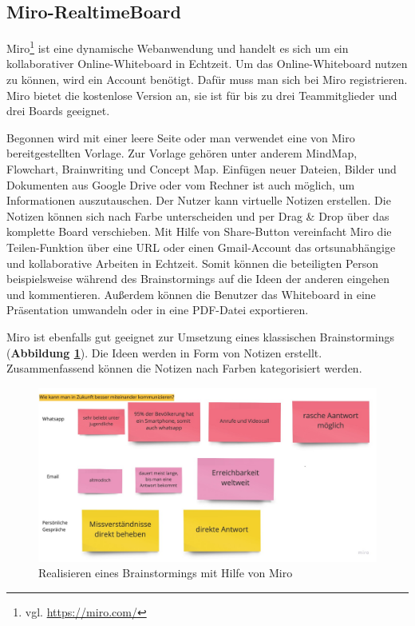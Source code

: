 \subsection{Miro-RealtimeBoard}
\label{sec:miro-realtimeBoard}
Miro\footnote{vgl. \url{https://miro.com/}} ist eine dynamische Webanwendung und handelt es sich um ein kollaborativer Online-Whiteboard in Echtzeit. Um das Online-Whiteboard nutzen zu können, wird ein Account benötigt. Dafür muss man sich bei Miro registrieren. Miro bietet die kostenlose Version an, sie ist für bis zu drei Teammitglieder und drei Boards geeignet.\bigskip

Begonnen wird mit einer leere Seite oder man verwendet eine von Miro bereitgestellten Vorlage. Zur Vorlage gehören unter anderem MindMap, Flowchart, Brainwriting und Concept Map. Einfügen neuer Dateien, Bilder und Dokumenten aus Google Drive oder vom Rechner ist auch möglich, um Informationen auszutauschen. Der Nutzer kann virtuelle Notizen erstellen. Die Notizen können sich nach Farbe unterscheiden und per Drag \& Drop über das komplette Board verschieben. Mit Hilfe von Share-Button vereinfacht Miro die Teilen-Funktion über eine URL oder einen Gmail-Account das ortsunabhängige und kollaborative Arbeiten in Echtzeit. Somit können die beteiligten Person beispielsweise während des Brainstormings auf die Ideen der anderen eingehen und kommentieren. Außerdem können die Benutzer das Whiteboard in eine Präsentation umwandeln oder in eine PDF-Datei exportieren.\bigskip

Miro ist ebenfalls gut geeignet zur Umsetzung eines klassischen Brainstormings (\textbf{Abbildung \ref{fig:miro board}}). Die Ideen werden in Form von Notizen erstellt. Zusammenfassend können die Notizen nach Farben kategorisiert werden.  

\begin{figure}[H]
  \begin{center}
    \includegraphics[scale=0.25]{img/miro1}
	\caption{Realisieren eines Brainstormings mit Hilfe von Miro} 
	\label{fig:miro board}
  \end{center}   
\end{figure}

